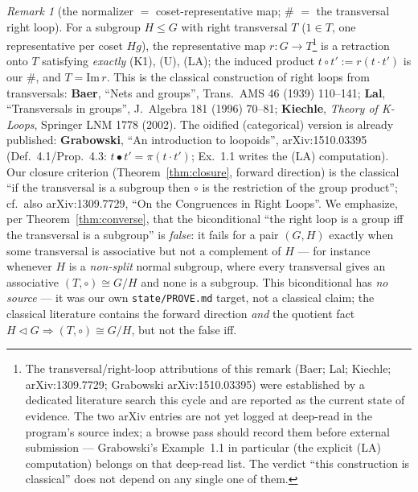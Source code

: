 \documentclass[11pt]{amsart}
\theoremstyle{plain}
\theoremstyle{definition}
\theoremstyle{remark}
\newtheorem{remark}[theorem]{Remark}
\newcommand{\Img}{\mathrm{Im}\,}
\newcommand{\sh}{\mathbin{\#}}
\newcommand{\LA}{\textsf{(LA)}}
\begin{document}
\begin{remark}[the normalizer $=$ coset-representative map; $\sh$ $=$ the transversal right loop]
\label{rem:classical}
For a subgroup $H\le G$ with right transversal $T$ ($1\in T$, one representative per coset $Hg$), the
representative map $r\colon G\to T$\footnote{The transversal/right-loop attributions of this remark
(Baer; Lal; Kiechle; arXiv:1309.7729; Grabowski arXiv:1510.03395) were established by a dedicated
literature search this cycle and are reported as the current state of evidence. The two arXiv entries
are not yet logged at deep-read in the program's source index; a browse pass should record them before
external submission --- Grabowski's Example~1.1 in particular (the explicit \LA{} computation)
belongs on that deep-read list. The verdict ``this construction is classical'' does not depend on
any single one of them.} is a retraction onto $T$ satisfying \emph{exactly} \textsf{(K1)},
\textsf{(U)}, \LA{}; the induced product $t\circ t':=r(t\cdot t')$ is our $\sh$, and $T=\Img r$. This
is the classical construction of right loops from transversals: \textbf{Baer}, ``Nets and groups'',
Trans.\ AMS 46 (1939) 110--141; \textbf{Lal}, ``Transversals in groups'', J.\ Algebra 181 (1996)
70--81; \textbf{Kiechle}, \emph{Theory of K-Loops}, Springer LNM 1778 (2002). The oidified
(categorical) version is already published: \textbf{Grabowski}, ``An introduction to loopoids'',
arXiv:1510.03395 (Def.~4.1/Prop.~4.3: $t\bullet t'=\pi(t\cdot t')$; Ex.~1.1 writes the \LA{}
computation). Our closure criterion (Theorem~\ref{thm:closure}, forward direction) is the classical
``if the transversal is a subgroup then $\circ$ is the restriction of the group product''; cf.\ also
arXiv:1309.7729, ``On the Congruences in Right Loops''. We emphasize, per Theorem~\ref{thm:converse},
that the biconditional ``the right loop is a group iff the transversal is a subgroup'' is
\emph{false}: it fails for a pair $(G,H)$ exactly when some transversal is associative but not a
complement of $H$ --- for instance whenever $H$ is a \emph{non-split} normal subgroup, where every
transversal gives an associative $(T,\circ)\cong G/H$ and none is a subgroup. This biconditional has
\emph{no source} --- it was our own \texttt{state/PROVE.md} target, not a classical claim; the
classical literature contains the forward direction \emph{and} the quotient fact $H\triangleleft
G\Rightarrow(T,\circ)\cong G/H$, but not the false iff.
\end{remark}
\end{document}

